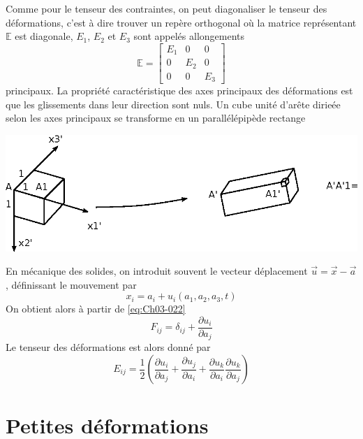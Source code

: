 Comme pour le tenseur des contraintes, on peut diagonaliser le tenseur des déformations, c'est à dire trouver un repère orthogonal où la matrice représentant $\mathbb{E}$ est diagonale, $E_1$, $E_2$ et $E_3$ sont appelés allongements
\begin{equation}
    \mathbb{E} = 
    \begin{bmatrix}
        E_1 & 0 & 0 \\
        0 & E_2 & 0 \\
        0 & 0 & E_3
    \end{bmatrix}
    \label{eq:Ch03-020}
\end{equation}
principaux.
La propriété caractéristique des axes principaux des déformations est que les glissements dans leur direction sont nuls.
Un cube unité d'arête dirieée selon les axes principaux se transforme en un parallélépipède rectange
\begin{center}
    \includegraphics{../images/T1_Ch03-0004}
\end{center}

En mécanique des solides, on introduit souvent le vecteur déplacement $\vec{u} = \vec{x}-\vec{a}$, définissant le mouvement par
\begin{equation}
    x_i = a_i + u_i \left( a_1, a_2, a_3, t \right)
    \label{eq:Ch03-021}
\end{equation}
On obtient alors à partir de \eqref{eq:Ch03-022}
\begin{equation}
    F_{ij} = \delta_{ij} + \frac{\partial u_i}{\partial a_j}
    \label{eq:Ch03-022}
\end{equation}
Le tenseur des déformations est alors donné par
\begin{equation}
    E_{ij} = \frac{1}{2} \left( \frac{\partial u_i}{\partial a_j} + \frac{\partial u_j}{\partial a_i} + \frac{\partial u_k}{\partial a_i}\frac{\partial u_k}{\partial a_j} \right)
    \label{eq:Ch03-023}
\end{equation}
\section{Petites déformations} \label{sec:Ch03-2}
